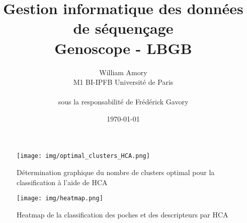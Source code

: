
\title{Gestion informatique des données de séquençage \\ Genoscope - LBGB}
\author{William Amory \\ M1 BI-IPFB Université de Paris \\\\ sous la responsabilité de Frédérick Gavory}
\date{\today}



\tableofcontents %
\newpage




\theendnotes
\newpage
{}


\nocite{*}


\begin{minipage}{0.45\textwidth}
	\begin{figure}[H]
		\centering
		\texttt{[image: img/optimal\_clusters\_HCA.png]}
		\caption{Détermination graphique du nombre de clusters optimal pour la classification à l'aide de HCA}
		\label{fig3}
	\end{figure}
\end{minipage} 
\hfill
\begin{minipage}{0.5\textwidth}
	\begin{figure}[H]
        \centering
        \texttt{[image: img/heatmap.png]}
        \caption{Heatmap de la classification des poches et des descripteurs par HCA}
        \label{fig4}
    \end{figure}
\end{minipage}


